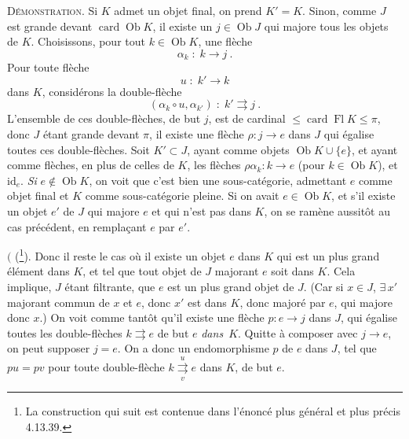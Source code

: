 \documentclass[11pt]{article}
\newcommand{\msp}[1]{\marginpar{\footnotesize [#1]}}
\newcommand{\Ob}{\operatorname{Ob}}
\newcommand{\Fl}{\operatorname{Fl}}
\newcommand{\card}{\operatorname{card}}
\newcommand{\id}{\mathrm{id}}
\begin{document}
\textsc{Démonstration}. Si $K$ admet un objet final, on prend $K' = K$. Sinon, comme $J$ est grande devant $\card \Ob K$, il existe un $j \in \Ob J$ qui majore tous les objets de $K$. Choisissons, pour tout $k \in \Ob K$, une flèche
\[ \alpha_k \;:\; k \longrightarrow j \ . \]
Pour toute flèche
\[ u \;:\; k' \longrightarrow k \]
dans $K$, considérons la double-flèche
\[ (\alpha_k \circ u, \alpha_{k'}) \;:\; k' \rightrightarrows j \ . \]
L'ensemble de ces double-flèches, de but $j$, est de cardinal $\leqslant \card \Fl K \leqslant \pi$, donc $J$ étant grande devant $\pi$, il existe une flèche $\rho : j \longrightarrow e$ dans $J$ qui égalise toutes ces double-flèches. Soit $K' \subset J$, ayant comme objets $\Ob K \cup \{e\}$, et ayant comme flèches, en plus de
\msp{page 363}
celles de $K$, les flèches $\rho\alpha_k : k \longrightarrow e$ (pour $k \in \Ob K$), et $\id_e$. \textit{Si} $e \notin \Ob K$, on voit que c'est bien une sous-catégorie, admettant $e$ comme objet final et $K$ comme sous-catégorie pleine. Si on avait $e \in \Ob K$, et s'il existe un objet $e'$ de $J$ qui majore $e$ et qui n'est pas dans $K$, on se ramène aussitôt au cas précédent, en remplaçant $e$ par $e'$.

$\Biggl($ (\footnote[161]{La construction qui suit est contenue dans l'énoncé plus général et plus précis 4.13.39.}). Donc il reste le cas où il existe un objet $e$ dans $K$ qui est un plus grand élément dans $K$, et tel que tout objet de $J$ majorant $e$ soit dans $K$. Cela implique, $J$ étant filtrante, que $e$ est un plus grand objet de $J$. (Car si $x \in J$, $\exists\, x'$ majorant commun de $x$ et $e$, donc $x'$ est dans $K$, donc majoré par $e$, qui majore donc $x$.) On voit comme tantôt qu'il existe une flèche $p : e \longrightarrow j$ dans $J$, qui égalise toutes les double-flèches $k \rightrightarrows e$ de but $e$ \textit{dans}~$K$. Quitte à composer avec $j \longrightarrow e$, on peut supposer $j = e$. On a donc un endomorphisme $p$ de $e$ dans $J$, tel que $pu = pv$ pour toute double-flèche $k \overset{u}{\underset{v}{\rightrightarrows}} e$ dans $K$, de but $e$.

\msp{page 364}
\end{document}
